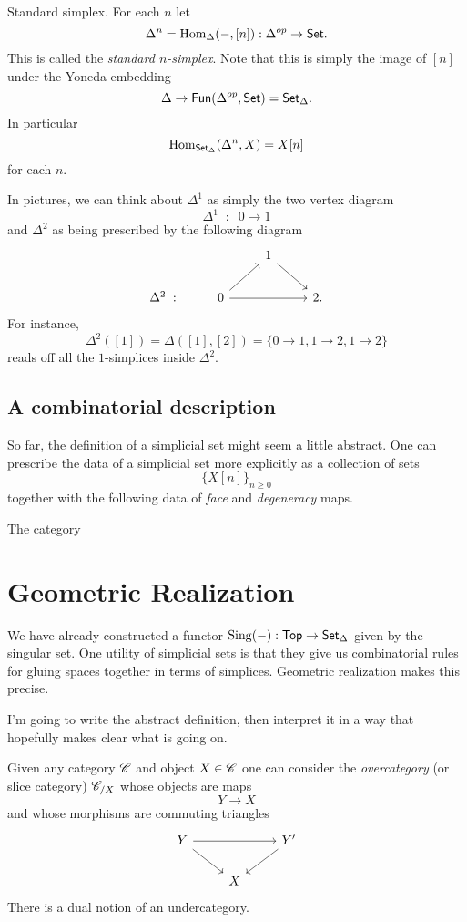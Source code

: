 \documentclass[11pt]{amsart}
\def\Fun{{\sf Fun}}
\def\Top{{\sf Top}}
\begin{document}
\begin{eg} 
Standard simplex.
For each $n$ let 
\[
\Delta^n = {\rm Hom}_{\Delta}(-, [n]) : \Delta^{op} \to {\sf Set} .
\]
This is called the {\em standard $n$-simplex}. 
Note that this is simply the image of $[n]$ under the Yoneda embedding
\[
\Delta \to \Fun(\Delta^{op}, \Set) = \Set_{\Delta} .
\]
In particular
\[
{\rm Hom}_{{\sf Set}_\Delta} (\Delta^n, X) = X[n]
\]
for each $n$. 
\end{eg}

In pictures, we can think about $\Delta^1$ as simply the two vertex diagram
\[
\Delta^1 \;\; : \;\; 0 \to 1
\]
and $\Delta^2$ as being prescribed by the following diagram
\[
\begin{tikzcd}
& & 1 \ar[dr] & \\
\Delta^2 \; :  & 0 \ar[ur] \ar[rr] && 2 . 
\end{tikzcd}
\]
For instance, 
\[
\Delta^2 ([1]) = \Delta([1],[2]) = \{0 \to 1, 1 \to 2, 1 \to 2\}
\]
reads off all the $1$-simplices inside $\Delta^2$. 

\subsection{A combinatorial description}

So far, the definition of a simplicial set might seem a little abstract. 
One can prescribe the data of a simplicial set more explicitly as a collection of sets
\[
\{X[n]\}_{n \geq 0}
\]
together with the following data of {\em face} and {\em degeneracy} maps. 

The category 




\section{Geometric Realization}
We have already constructed a functor ${\rm Sing} (-) : \Top \to \Set_{\Delta}$ given by the singular set. 
One utility of simplicial sets is that they give us combinatorial rules for gluing spaces together in terms of simplices. 
Geometric realization makes this precise. 

I'm going to write the abstract definition, then interpret it in a way that hopefully makes clear what is going on.

Given any category $\mathscr C$ and object $X \in \mathscr C$ one can consider the {\em overcategory} (or slice category) $\mathscr C_{/X}$ whose objects are maps
\[
Y \to X 
\]
and whose morphisms are commuting triangles
\[
\begin{tikzcd}
Y \ar[rr] \ar[dr] & & Y' \ar[dl] \\
& X & 
\end{tikzcd}
\]
There is a dual notion of an undercategory. 
\end{document}

